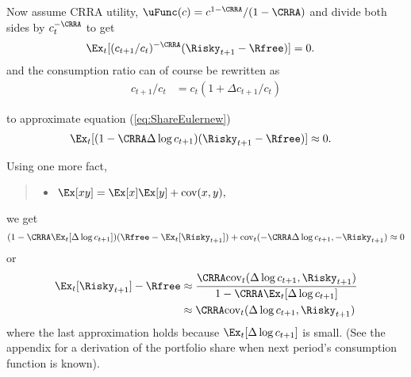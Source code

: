 \documentclass{\econtex}
\begin{document}
Now assume CRRA utility, $\uFunc(c) = c^{1-\CRRA}/(1-\CRRA)$ and divide both 
sides by $c_{t}^{-\CRRA}$ to get
\begin{equation}\begin{gathered}\begin{aligned}
      \Ex_{t}[(c_{t+1}/c_{t})^{-\CRRA}(\Risky_{t+1}-\Rfree)] & =  0. \label{eq:ShareEulernew}
    \end{aligned}\end{gathered}\end{equation}
and the consumption ratio can of course be rewritten as
\begin{align}
  c_{t+1}/c_{t} & = c_{t}(1+\Delta c_{t+1}/c_{t})
\end{align}

\noindent to approximate equation (\ref{eq:ShareEulernew})
\begin{equation}\begin{gathered}\begin{aligned}
      \Ex_{t}[(1-\CRRA \Delta \log {c}_{t+1})(\Risky_{t+1}-\Rfree)] & \approx  0.
    \end{aligned}\end{gathered}\end{equation}

\noindent Using one more fact,
\begin{quote}
  \begin{itemize}
  \item $\Ex [xy] = \Ex [x]\Ex [y] + \text{cov}(x,y),$
  \end{itemize}
\end{quote}
we get
\begin{equation}
  (1-\CRRA \Ex_{t}[\Delta \log {c}_{t+1}])(\Rfree - \Ex_{t}[\Risky_{t+1}])+\text{cov}_{t}(-\CRRA \Delta \log {c}_{t+1},-\Risky_{t+1})  \approx  0  
\end{equation}
or
\begin{equation}\begin{gathered}\begin{aligned}
      \Ex_{t}[\Risky_{t+1}]-\Rfree & \approx  \frac{\CRRA \text{cov}_{t}(\Delta \log {c}_{t+1},\Risky_{t+1})}{1-\CRRA \Ex_{t}[ \Delta \log {c}_{t+1}]} 
      \\                             & \approx  \CRRA \text{cov}_{t}(\Delta \log {c}_{t+1},\Risky_{t+1}) \label{eq:eqprem}
    \end{aligned}\end{gathered}\end{equation}
\noindent where the last approximation holds because $\Ex_{t}[\Delta 
\log {c}_{t+1}]$ is small.  (See the appendix for a derivation of the portfolio share when next period's consumption function is known).
\end{document}
